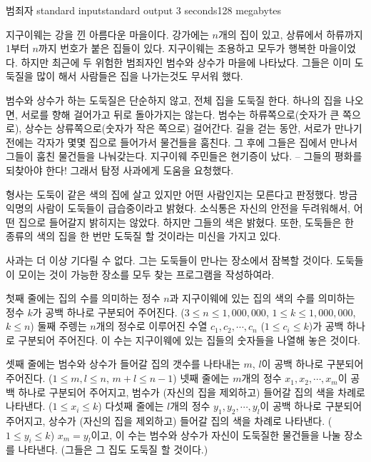 \begin{problem}{범죄자}
	{standard input}{standard output}
	{3 seconds}{128 megabytes}{}
	
	지구이웨는 강을 낀 아름다운 마을이다. 강가에는 $n$개의 집이 있고, 상류에서 하류까지 1부터 $n$까지 번호가 붙은 집들이 있다. 지구이웨는 조용하고 모두가 행복한 마을이었다. 하지만 최근에 두 위험한 범죄자인 범수와 상수가 마을에 나타났다. 그들은 이미 도둑질을 많이 해서 사람들은 집을 나가는것도 무서워 했다.
	
	범수와 상수가 하는 도둑질은 단순하지 않고, 전체 집을 도둑질 한다. 하나의 집을 나오면, 서로를 향해 걸어가고 뒤로 돌아가지는 않는다. 범수는 하류쪽으로(숫자가 큰 쪽으로), 상수는 상류쪽으로(숫자가 작은 쪽으로) 걸어간다. 길을 걷는 동안, 서로가 만나기 전에는 각자가 몇몇 집으로 들어가서 물건들을 훔친다. 그 후에 그들은 집에서 만나서 그들이 훔친 물건들을 나눠갖는다. 지구이웨 주민들은 현기증이 났다. -- 그들의 평화를 되찾아야 한다! 그래서 탐정 사과에게 도움을 요청했다.
	
	형사는 도둑이 같은 색의 집에 살고 있지만 어떤 사람인지는 모른다고 판정했다. 방금 익명의 사람이 도둑들이 급습중이라고 밝혔다. 소식통은 자신의 안전을 두려워해서, 어떤 집으로 들어갈지 밝히지는 않았다. 하지만 그들의 색은 밝혔다. 또한, 도둑들은 한 종류의 색의 집을 한 번만 도둑질 할 것이라는 미신을 가지고 있다.
	
	사과는 더 이상 기다릴 수 없다. 그는 도둑들이 만나는 장소에서 잠복할 것이다. 도둑들이 모이는 것이 가능한 장소를 모두 찾는 프로그램을 작성하여라.
	
	
	\InputFile
	
	첫째 줄에는 집의 수를 의미하는 정수 $n$과 지구이웨에 있는 집의 색의 수를 의미하는 정수 $k$가 공백 하나로 구분되어 주어진다. ($3 \le n \le 1,000,000$, $1 \le k \le 1,000,000$, $k \le n$) 둘째 주렝는 $n$개의 정수로 이루어진 수열 $c_1, c_2, \cdots, c_n$ ($1 \le c_i \le k$)가 공백 하나로 구분되어 주어진다. 이 수는 지구이웨에 있는 집들의 숫자들을 나열해 놓은 것이다.
	
	셋째 줄에는 범수와 상수가 들어갈 집의 갯수를 나타내는 $m$, $l$이 공백 하나로 구분되어 주어진다. ($1 \le m, l \le n$, $m+l \le n-1$)
	넷째 줄에는 $m$개의 정수 $x_1, x_2, \cdots, x_m$이 공백 하나로 구분되어 주어지고, 범수가 (자신의 집을 제외하고) 들어갈 집의 색을 차례로 나타낸다. ($1 \le x_i \le k$)
	다섯째 줄에는 $l$개의 정수 $y_1, y_2, \cdots, y_l$이 공백 하나로 구분되어 주어지고, 상수가 (자신의 집을 제외하고) 들어갈 집의 색을 차례로 나타낸다. ($1 \le y_i \le k$)
	$x_m = y_l$이고, 이 수는 범수와 상수가 자신이 도둑질한 물건들을 나눌 장소를 나타낸다. (그들은 그 집도 도둑질 할 것이다.)
	

\end{problem}
